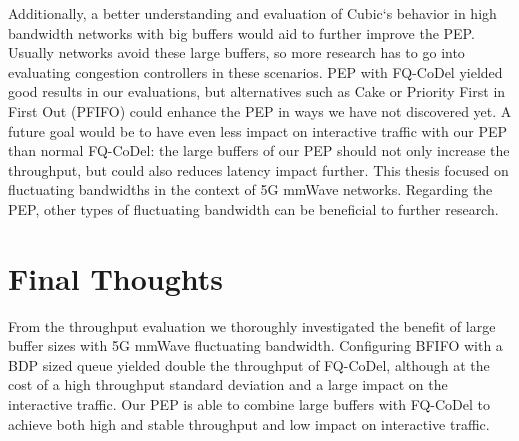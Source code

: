 \documentclass[a4paper,english, 11pt]{report}
\begin{document}
Additionally, a better understanding and evaluation of Cubic`s behavior in high bandwidth networks with big buffers would aid to further improve the PEP. Usually networks avoid these large buffers, so more research has to go into evaluating congestion controllers in these scenarios. PEP with FQ-CoDel yielded good results in our evaluations, but alternatives such as Cake or Priority First in First Out (PFIFO) could enhance the PEP in ways we have not discovered yet. A future goal would be to have even less impact on interactive traffic with our PEP than normal FQ-CoDel: the large buffers of our PEP should not only increase the throughput, but could also reduces latency impact further. This thesis focused on fluctuating bandwidths in the context of 5G mmWave networks. Regarding the PEP, other types of fluctuating bandwidth can be beneficial to further research.\\

\section{Final Thoughts}
From the throughput evaluation we thoroughly investigated the benefit of large buffer sizes with 5G mmWave fluctuating bandwidth. Configuring BFIFO with a BDP sized queue yielded double the throughput of FQ-CoDel, although at the cost of a high throughput standard deviation and a large impact on the interactive traffic. Our PEP is able to combine large buffers with FQ-CoDel to achieve both high and stable throughput and low impact on interactive traffic.\\

{}

\end{document}
